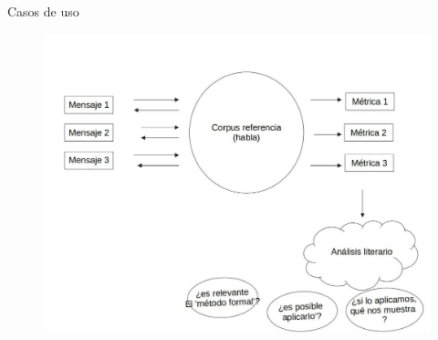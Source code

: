 \documentclass[presentation]{beamer}
\begin{document}
\begin{frame}[label={sec:org8cf1f26}]{Casos de uso}
  \begin{figure}
   \includegraphics[width=\textwidth]{./assets/posibles_usos.jpg}

\end{figure}
\end{frame}
\end{document}
